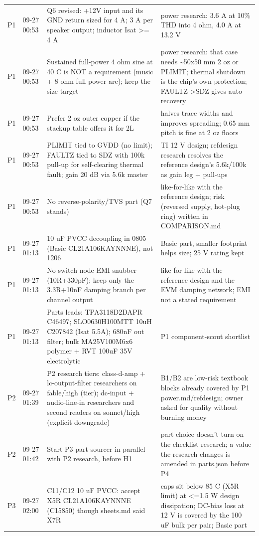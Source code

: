\documentclass[11pt]{article}
\begin{document}
{\begin{longtable}{lp{1.6cm}p{6.2cm}p{6.2cm}}
P1 & 09-27 00:53 & Q6 revised: +12V input and its GND return sized for 4 A; 3 A per speaker output; inductor Isat \textgreater{}= 4 A & power research: 3.6 A at 10\% THD into 4 ohm, 4.0 A at 13.2 V \\
P1 & 09-27 00:53 & Sustained full-power 4 ohm sine at 40 C is NOT a requirement (music + 8 ohm full power are); keep the size target & power research: that case needs \textasciitilde{}50x50 mm 2 oz or PLIMIT; thermal shutdown is the chip's own protection; FAULTZ-\textgreater{}SDZ gives auto-recovery \\
P1 & 09-27 00:53 & Prefer 2 oz outer copper if the stackup table offers it for 2L & halves trace widths and improves spreading; 0.65 mm pitch is fine at 2 oz floors \\
P1 & 09-27 00:53 & PLIMIT tied to GVDD (no limit); FAULTZ tied to SDZ with 100k pull-up for self-clearing thermal fault; gain 20 dB via 5.6k master & TI 12 V design; refdesign research resolves the reference design's 5.6k/100k as gain leg + pull-ups \\
P1 & 09-27 00:53 & No reverse-polarity/TVS part (Q7 stands) & like-for-like with the reference design; risk (reversed supply, hot-plug ring) written in COMPARISON.md \\
P1 & 09-27 01:13 & 10 uF PVCC decoupling in 0805 (Basic CL21A106KAYNNNE), not 1206 & Basic part, smaller footprint helps size; 25 V rating kept \\
P1 & 09-27 01:13 & No switch-node EMI snubber (10R+330pF); keep only the 3.3R+10nF damping branch per channel output & like-for-like with the reference design and the EVM damping network; EMI not a stated requirement \\
P1 & 09-27 01:13 & Parts leads: TPA3118D2DAPR C46497; SLO0630H100MTT 10uH C207842 (Isat 5.5A); 680nF out filter; bulk MA25V100M6x6 polymer + RVT 100uF 35V electrolytic & P1 component-scout shortlist \\
P2 & 09-27 01:39 & P2 research tiers: class-d-amp + lc-output-filter researchers on fable/high (tier); dc-input + audio-line-in researchers and second readers on sonnet/high (explicit downgrade) & B1/B2 are low-risk textbook blocks already covered by P1 power.md/refdesign; owner asked for quality without burning money \\
P2 & 09-27 01:42 & Start P3 part-sourcer in parallel with P2 research, before H1 & part choice doesn't turn on the checklist research; a value the research changes is amended in parts.json before P4 \\
P3 & 09-27 02:00 & C11/C12 10 uF PVCC: accept X5R CL21A106KAYNNNE (C15850) though sheets.md said X7R & caps sit below 85 C (X5R limit) at \textless{}=1.5 W design dissipation; DC-bias loss at 12 V is covered by the 100 uF bulk per pair; Basic part \\

\end{longtable}}
\end{document}

